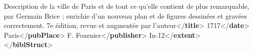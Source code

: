 \begin{shaded}
\hspace*{1em}Description de la ville de Paris et de tout ce qu’elle contient de plus remarquable, par Germain Brice ; enrichie d’un nouveau plan et de figures dessinées et gravées correctement. 7e édition, revue et augmentée par l’auteur{</\textbf{title}>}\mbox{}\newline 
\hspace*{1em}\mbox{}\newline 
\hspace*{1em}\hspace*{1em}1717{</\textbf{date}>}\mbox{}\newline 
\hspace*{1em}\hspace*{1em}Paris{</\textbf{pubPlace}>}\mbox{}\newline 
\hspace*{1em}\hspace*{1em}F. Fournier{</\textbf{publisher}>}\mbox{}\newline 
\hspace*{1em}\mbox{}\newline 
\hspace*{1em}In-12{</\textbf{extent}>}\mbox{}\newline 
{}\mbox{}\newline 
{}\mbox{}\newline 
{</\textbf{biblStruct}>}\end{shaded}\egroup\par 
